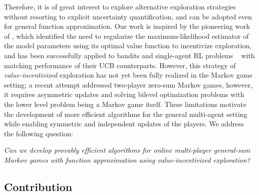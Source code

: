 Therefore, it is of great interest to explore alternative exploration strategies without resorting to explicit uncertainty quantification, and can be adopted even for general function approximation. Our work is inspired by the pioneering work of \citet{kumar1982new}, which identified the need to regularize the maximum-likelihood estimator of the model parameters using its optimal value function to incentivize exploration, and has been successfully applied to bandits and  single-agent RL problems ~\citep{liu2020exploration,hung2021reward,mete2021reward,liu2024maximize} with matching performance of their UCB counterparts. However, this strategy of {\em value-incentivized} exploration has not yet been fully realized in the Markov game setting; a recent attempt \citep{liu2024maximize} addressed    two-player zero-sum Markov games, however, it requires  asymmetric updates and solving bilevel optimization problems with the lower level problem being a Markov game itself. 
These limitations motivate the development of more efficient algorithms for the general multi-agent setting while enabling symmetric and independent updates of the players. 
 We address the following question: 
\begin{center}
    \emph{Can we develop provably efficient algorithms for online multi-player general-sum Markov games with function approximation using value-incentivized exploration?}
\end{center} 


 

\subsection{Contribution}
 

